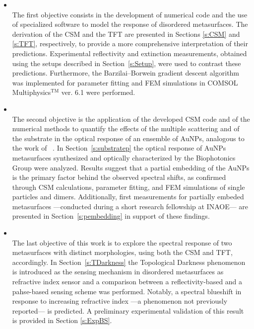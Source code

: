 \begin{itemize}
	\renewcommand\labelitemi{\textcolor{pblueFC}{$\blacktriangleright$}}
	\item {}\\
	 The first objective consists in the development of numerical code and the use of specialized software to model the response of disordered metasurfaces. The derivation of the CSM and the TFT are presented in Sections \ref{s:CSM} and \ref{s:TFT}, respectively, to provide a more comprehensive interpretation of their predictions. Experimental reflectivity and extinction measurements, obtained using the setups described in Section~\ref{s:Setup}, were used to contrast these predictions. Furthermore, the Barzilai–Borwein gradient descent algorithm \cite{barzilai_two-point_1988} was implemented for parameter fitting and FEM simulations in COMSOL Multiphysics$^\text{TM}$ ver. 6.1 were performed.
%	
	\item {}\\
	The second objective is the application of the developed CSM code and of the numerical methods to quantify the effects of the multiple scattering and of the substrate in the optical response of an ensemble of AuNPs, analogous to the work of \citeauthor*{borah_plasmon_2022}~\cite{borah_plasmon_2022}. In Section~\ref{s:substratep} the optical response of AuNPs metasurfaces synthesized and optically characterized by the Biophotonics Group were analyzed. Results suggest that a  partial  embedding of the AuNPs is the primary factor behind the observed spectral shifts, as confirmed through CSM calculations, parameter fitting, and FEM simulations of single particles and dimers. Additionally, first measurements for partially embeded metasurfaces ---conducted during a short research fellowship at INAOE--- are presented in Section~\ref{s:pembedding} in support of these findings. 
%	
	\item {}\\
	The last  objective of this work is to explore the spectral response of two metasurfaces with distinct morphologies, using both the CSM and TFT, accordingly. In Section~\ref{s:TDarkness} the Topological Darkness phenomenon \cite{ermolaev_topological_2022} is introduced as the sensing mechanism in disordered metasurfaces as refractive index sensor  and a comparison between a reflectivity-based and a pahse-based sensing scheme was performed. Notably, a spectral blueshift in response to increasing refractive index ---a phenomenon not previously reported--- is predicted. A preliminary experimental validation of this result is provided in Section \ref{s:ExpBS}.
\end{itemize}